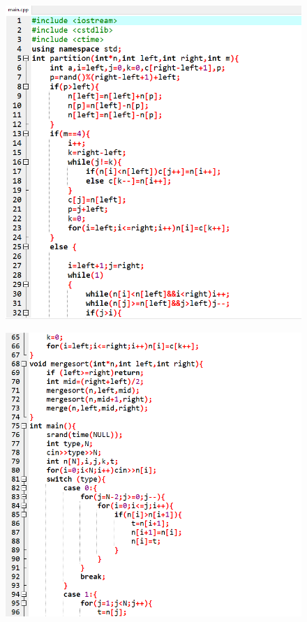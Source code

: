 \documentclass[12pt]{article}
\begin{document}
\begin{figure}[H]
\centering
\includegraphics[scale=0.6]{P8.png}
\end{figure}
\begin{figure}[H]
\centering
\includegraphics[scale=0.6]{P10.png}
\end{figure}
\end{document}
